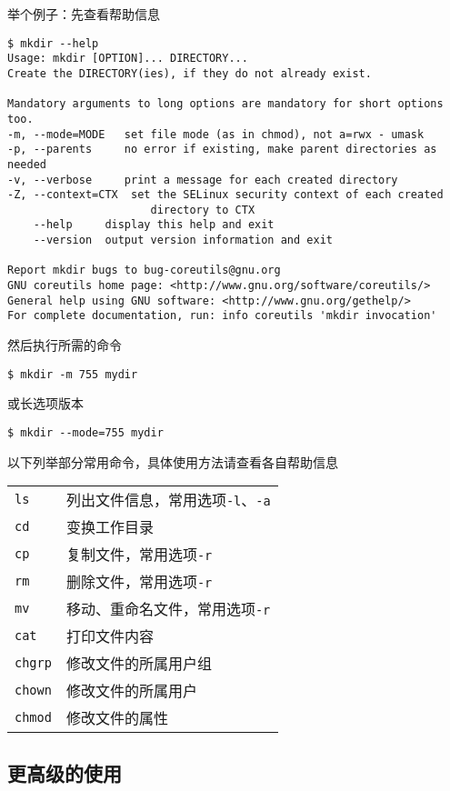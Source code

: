 \documentclass[a4paper]{article}
\begin{document}
举个例子：先查看帮助信息
\begin{verbatim}
$ mkdir --help
Usage: mkdir [OPTION]... DIRECTORY...
Create the DIRECTORY(ies), if they do not already exist.

Mandatory arguments to long options are mandatory for short options too.
-m, --mode=MODE   set file mode (as in chmod), not a=rwx - umask
-p, --parents     no error if existing, make parent directories as needed
-v, --verbose     print a message for each created directory
-Z, --context=CTX  set the SELinux security context of each created
                      directory to CTX
    --help     display this help and exit
    --version  output version information and exit

Report mkdir bugs to bug-coreutils@gnu.org
GNU coreutils home page: <http://www.gnu.org/software/coreutils/>
General help using GNU software: <http://www.gnu.org/gethelp/>
For complete documentation, run: info coreutils 'mkdir invocation'
\end{verbatim}
然后执行所需的命令
\begin{verbatim}
$ mkdir -m 755 mydir
\end{verbatim}
或长选项版本
\begin{verbatim}
$ mkdir --mode=755 mydir
\end{verbatim}

以下列举部分常用命令，具体使用方法请查看各自帮助信息

\begin{center}
\begin{tabular}{p{3cm} p{8cm}}
  \hline
  \verb|ls| & 列出文件信息，常用选项\verb|-l|、\verb|-a|\\
  \verb|cd| & 变换工作目录\\
  \verb|cp| & 复制文件，常用选项\verb|-r|\\
  \verb|rm| & 删除文件，常用选项\verb|-r|\\
  \verb|mv| & 移动、重命名文件，常用选项\verb|-r|\\
  \verb|cat| & 打印文件内容\\
  \verb|chgrp| & 修改文件的所属用户组\\
  \verb|chown| & 修改文件的所属用户\\
  \verb|chmod| & 修改文件的属性\\
  \hline
\end{tabular}
\end{center}

\subsection{更高级的使用}
\end{document}
